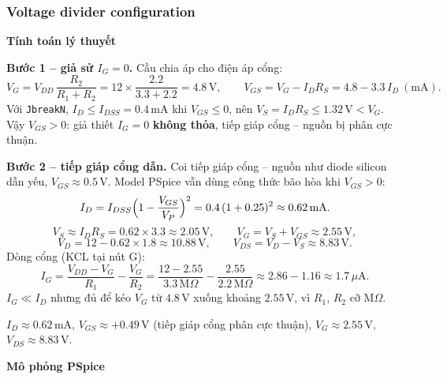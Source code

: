 \subsubsection{Voltage divider configuration}\label{sec:jfet-divider}

\par\medskip\noindent\textbf{Tính toán lý thuyết}\par\smallskip
\textbf{Bước 1 -- giả sử $I_G = 0$.} Cầu chia áp cho điện áp cổng:
\[
V_G = V_{DD}\,\frac{R_2}{R_1 + R_2} = 12 \times \frac{2.2}{3.3 + 2.2} = 4.8\,\text{V},
\qquad V_{GS} = V_G - I_D R_S = 4.8 - 3.3\,I_D\ (\text{mA}).
\]
Với \texttt{JbreakN}, $I_D \le I_{DSS} = 0.4\,\text{mA}$ khi $V_{GS} \le 0$, nên $V_S = I_D R_S \le 1.32\,\text{V} < V_G$. Vậy $V_{GS} > 0$: giả thiết $I_G = 0$ \textbf{không thỏa}, tiếp giáp cổng -- nguồn bị phân cực thuận.

\textbf{Bước 2 -- tiếp giáp cổng dẫn.} Coi tiếp giáp cổng -- nguồn như diode silicon dẫn yếu, $V_{GS} \approx 0.5\,\text{V}$. Model PSpice vẫn dùng công thức bão hòa khi $V_{GS} > 0$:
\[
I_D = I_{DSS}\Bigl(1 - \frac{V_{GS}}{V_P}\Bigr)^2 = 0.4\,(1 + 0.25)^2 \approx 0.62\,\text{mA}.
\]
\[
V_S \approx I_D R_S = 0.62 \times 3.3 \approx 2.05\,\text{V},\qquad
V_G = V_S + V_{GS} \approx 2.55\,\text{V},
\]
\[
V_D = 12 - 0.62 \times 1.8 \approx 10.88\,\text{V},\qquad
V_{DS} = V_D - V_S \approx 8.83\,\text{V}.
\]
Dòng cổng (KCL tại nút G):
\[
I_G = \frac{V_{DD} - V_G}{R_1} - \frac{V_G}{R_2} = \frac{12 - 2.55}{3.3\,\text{M}\Omega} - \frac{2.55}{2.2\,\text{M}\Omega} \approx 2.86 - 1.16 \approx 1.7\,\mu\text{A}.
\]
$I_G \ll I_D$ nhưng đủ để kéo $V_G$ từ $4.8\,\text{V}$ xuống khoảng $2.55\,\text{V}$, vì $R_1$, $R_2$ cỡ M$\Omega$.

\begin{dapsobox}
$I_D \approx 0.62\,\text{mA}$, \quad $V_{GS} \approx +0.49\,\text{V}$ (tiếp giáp cổng phân cực thuận), \quad $V_G \approx 2.55\,\text{V}$, \quad $V_{DS} \approx 8.83\,\text{V}$.
\end{dapsobox}

\par\medskip\noindent\textbf{Mô phỏng PSpice}\par\smallskip
{}
\simresult
{}

